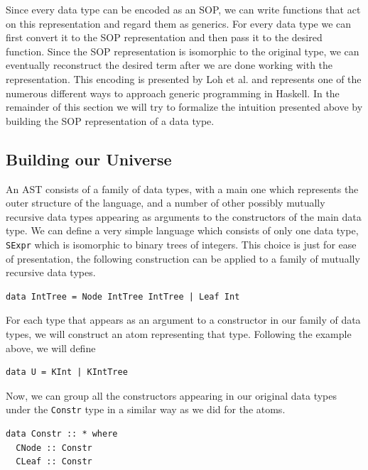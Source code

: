 \documentclass[11pt, titlepage]{article}
\begin{document}
Since every data type can be encoded as an SOP, we can write functions 
that act on this representation and regard them as generics. For every data type 
we can first convert it to the SOP representation and then pass it to 
the desired function. Since the SOP representation is isomorphic to the original type, we can eventually reconstruct the 
desired term after we are done working with the representation. This encoding is 
presented by Loh et al. \cite{true-sop} and represents one of the numerous different ways to 
approach generic programming in Haskell. 
In the remainder of this section we will try to formalize the intuition presented 
above by building the SOP representation of a data type. 

\subsection{Building our Universe}\label{universe}

An AST consists of a family of data types, with a main one which
represents the outer structure of the language, and a number of other
possibly mutually recursive data types appearing as arguments to the
constructors of the main data type. We can define a very simple language which 
consists of only one data type, \texttt{SExpr} which is isomorphic to binary trees 
of integers. This choice is just for ease of presentation, the following construction 
can be applied to a family of mutually recursive data types.

\begin{verbatim}
data IntTree = Node IntTree IntTree | Leaf Int
\end{verbatim}

For each type that appears as an argument to a constructor in our family
of data types, we will construct an atom representing that type.
Following the example above, we will define

\begin{verbatim}
data U = KInt | KIntTree 
\end{verbatim}

Now, we can group all the constructors appearing in our original
data types under the \texttt{Constr} type in a similar way as we
did for the atoms. 

\begin{verbatim}
data Constr :: * where
  CNode :: Constr
  CLeaf :: Constr
\end{verbatim}
\end{document}
